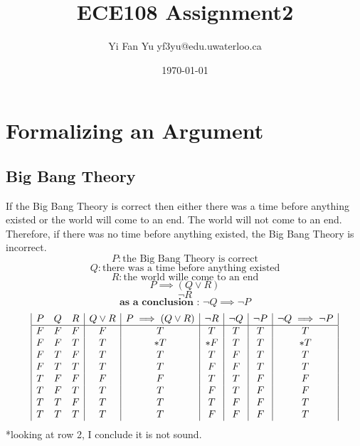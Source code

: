 \documentclass[a4paper,12pt]{article}
\begin{document}
\title{ECE108 Assignment2}
\author{Yi Fan Yu yf3yu@edu.uwaterloo.ca}
\date{\today}
\maketitle

\tableofcontents
\newpage

\section{Formalizing an Argument}
\subsection{Big Bang Theory}
If the Big Bang Theory is correct then either there was a time before anything existed or the world will come to an end.  The world will not come to an end.  Therefore, if there was no time before anything existed, the Big Bang Theory is incorrect.
\[
P: \text{the Big Bang Theory is correct} 
\]
\[
Q: \text{there was a time before anything existed}
\]
\[
R: \text{the world wille come to an end} 
\]
\begin{equation} 
P \implies (Q \vee R) 
\end{equation}
\begin{equation} 
\neg R 
\end{equation}
\begin{equation} 
 \textbf{as a conclusion : } \neg Q \implies \neg P 
\end{equation}
\begin{displaymath}
\begin {array} {|c c c|c|c|c|c|c|c|}
P & Q & R & Q \vee R & P \implies (Q \vee R) & 
\neg R & \neg Q & \neg P & \neg Q \implies \neg P\\
\hline
F & F & F & F & T & T & T & T & T\\
F & F & T & T & *T & *F & T & T & *T\\
F & T & F & T & T & T & F & T & T\\
F & T & T & T & T & F & F & T & T\\
T & F & F & F & F & T & T & F & F\\
T & F & T & T & T & F & T & F & F\\
T & T & F & T & T & T & F & F & T\\
T & T & T & T & T & F & F & F & T\\
\end{array}
\end{displaymath}
*looking at row 2, I conclude it is not sound.
\pagebreak
\end{document}
